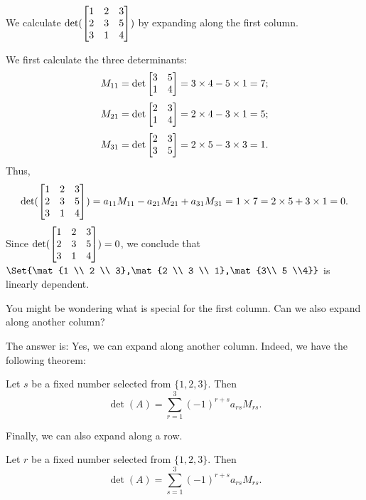 \begin{example}
	We calculate $\det(\mat{1 & 2 & 3 \\ 2 & 3 & 5 \\ 3 & 1 & 4})$ by expanding along
	the first column.

	We first calculate the three determinants:
	\[
		M_{11}=\det\mat{3 & 5 \\ 1 & 4}=3\times 4 - 5\times 1=7;
	\]
	\[
		M_{21}=\det\mat{2 & 3 \\ 1 & 4}=2\times 4 - 3\times 1=5;
	\]
	\[
		M_{31}=\det\mat{2 & 3 \\ 3 & 5}=2\times 5 - 3\times 3=1.
	\]
	Thus,
	\[
		\det(\mat{1 & 2 & 3 \\ 2 & 3 & 5 \\ 3 & 1 & 4})=a_{11}M_{11}-a_{21}M_{21}+a_{31}M_{31}=1\times 7=2\times 5+3\times 1=0.
	\]
	Since $\det(\mat{1 & 2 & 3 \\ 2 & 3 & 5 \\ 3 & 1 & 4})=0$, we conclude that
	$\Set{\mat{1 \\ 2 \\ 3},\mat{2 \\ 3 \\ 1},\mat{3\\ 5 \\4}}$ is linearly
	dependent.
\end{example}

You might be wondering what is special for the first column. Can we also expand
along another column?

The answer is: Yes, we can expand along another column. Indeed, we have the
following theorem:
\begin{theorem}
	Let $s$ be a fixed number selected from $\{1,2,3\}$. Then
	\[
		\det(A)=\sum_{r=1}^{3}(-1)^{r+s}a_{rs}M_{rs}.
	\]
\end{theorem}

Finally, we can also expand along a row.
\begin{theorem}
	Let $r$ be a fixed number selected from $\{1,2,3\}$. Then
	\[
		\det(A)=\sum_{s=1}^{3}(-1)^{r+s}a_{rs}M_{rs}.
	\]
\end{theorem}

